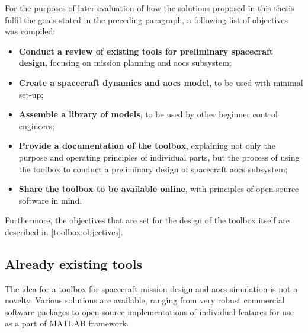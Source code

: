     For the purposes of later evaluation of how the solutions proposed in this thesis fulfil the goals stated in the preceding paragraph, a following list of objectives was compiled:

    \begin{itemize}
        \item \textbf{Conduct a review of existing tools for preliminary spacecraft design}, focusing on mission planning and \ac{aocs} subsystem;
        \item \textbf{Create a spacecraft dynamics and \ac{aocs} model}, to be used with minimal set-up;
        \item \textbf{Assemble a library of models}, to be used by other beginner control engineers;
        \item \textbf{Provide a documentation of the toolbox}, explaining not only the purpose and operating principles of individual parts, but the process of using the toolbox to conduct a preliminary design of spacecraft \ac{aocs} subsystem;
        \item \textbf{Share the toolbox to be available online}, with principles of open-source software in mind.
    \end{itemize}

    Furthermore, the objectives that are set for the design of the toolbox itself are described in \autoref{toolbox:objectives}.


\subsection{Already existing tools}\label{sec:review}

    The idea for a toolbox for spacecraft mission design and \ac{aocs} simulation is not a novelty. Various solutions are available, ranging from very robust commercial software packages to open-source implementations of individual features for use as a part of MATLAB framework.

